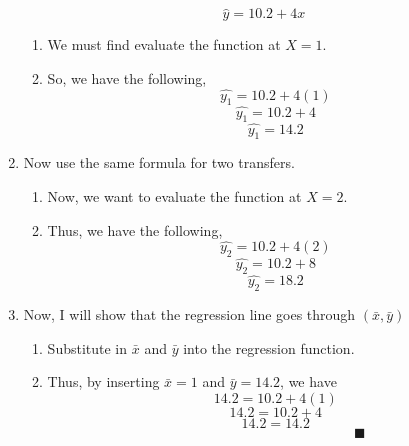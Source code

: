 \documentclass{article}
\begin{document}
\begin{enumerate}[label= \alph*)]
			\[\hat{y} = 10.2 +4x\]
		\begin{enumerate}[label = \arabic*)]
			\item We must find evaluate the function at $X = 1$.
			\item So, we have the following,
				\[\hat{y_1} = 10.2 + 4(1)\]
				\[\hat{y_1} = 10.2 + 4\]
				\[\hat{y_1} = 14.2\]
		\end{enumerate}
		\item Now use the same formula for two transfers.
		\begin{enumerate}[label = \arabic*)]
			\item Now, we want to evaluate the function at $X = 2$.
			\item Thus, we have the following,
				\[\hat{y_2} = 10.2 + 4(2)\]
				\[\hat{y_2} = 10.2 + 8\]
				\[\hat{y_2} = 18.2\]
		\end{enumerate}
	
		\item Now, I will show that the regression line goes through $(\bar{x},\bar{y})$
		\begin{enumerate}[label = \arabic*)]
			\item Substitute in $\bar{x}$ and $\bar{y}$ into the regression function.
			\item Thus, by inserting $\bar{x} = 1$ and $\bar{y} = 14.2$, we have
				\[14.2 = 10.2 + 4(1)\]
				\[14.2 = 10.2 + 4\]
				\[14.2 = 14.2 \]
				\[ \qquad \qquad  \qquad \qquad \qquad \qquad \blacksquare\]
		\end{enumerate}
			
	\end{enumerate}
\end{document}
